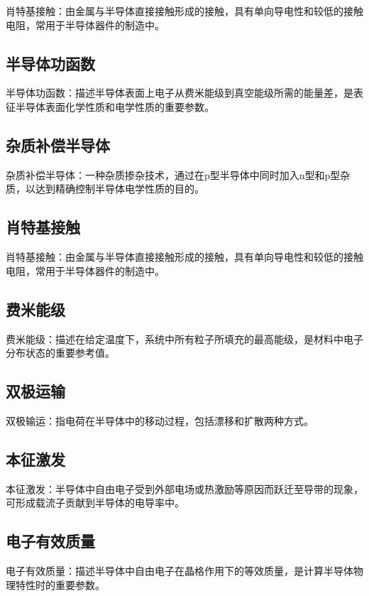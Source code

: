 \documentclass[UTF8]{ctexart}   %
\begin{document}
肖特基接触：由金属与半导体直接接触形成的接触，具有单向导电性和较低的接触电阻，常用于半导体器件的制造中。

\subsection{半导体功函数}

半导体功函数：描述半导体表面上电子从费米能级到真空能级所需的能量差，是表征半导体表面化学性质和电学性质的重要参数。

\subsection{杂质补偿半导体}

杂质补偿半导体：一种杂质掺杂技术，通过在p型半导体中同时加入n型和p型杂质，以达到精确控制半导体电学性质的目的。

\subsection{肖特基接触}

肖特基接触：由金属与半导体直接接触形成的接触，具有单向导电性和较低的接触电阻，常用于半导体器件的制造中。

\subsection{费米能级}

费米能级：描述在给定温度下，系统中所有粒子所填充的最高能级，是材料中电子分布状态的重要参考值。

\subsection{双极运输}

双极输运：指电荷在半导体中的移动过程，包括漂移和扩散两种方式。

\subsection{本征激发}

本征激发：半导体中自由电子受到外部电场或热激励等原因而跃迁至导带的现象，可形成载流子贡献到半导体的电导率中。

\subsection{电子有效质量}

电子有效质量：描述半导体中自由电子在晶格作用下的等效质量，是计算半导体物理特性时的重要参数。
\end{document}
